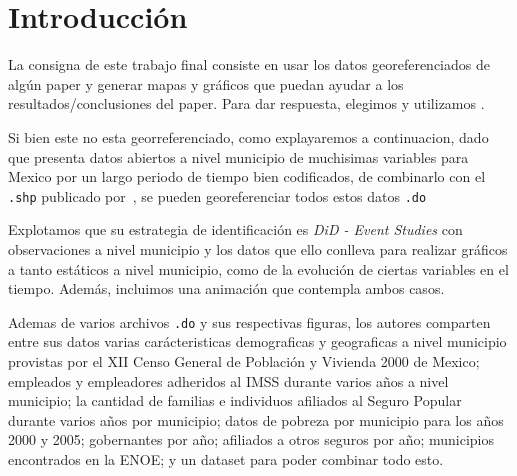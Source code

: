 \documentclass[9pt]{article}
\begin{document}
\section*{Introducci\'on}
La consigna de este trabajo final consiste en usar los datos georeferenciados de algún paper y generar mapas y gráficos que puedan ayudar a los resultados/conclusiones del paper. Para dar respuesta, elegimos y utilizamos \cite{10.1257/pol.6.4.71}. 

Si bien este no est\’a georreferenciado, como explayaremos a continuaci\’on, dado que presenta datos abiertos a nivel municipio de much\’isimas variables para M\’exico por un largo per\’iodo de tiempo bien codificados, de combinarlo con el \texttt{.shp} publicado por~\cite{shapefile}, se pueden georeferenciar todos estos datos \texttt{.do}

Explotamos que su estrategia de identificaci\'on es \textit{DiD - Event Studies} con observaciones a nivel municipio y los datos que ello conlleva para realizar gr\'aficos a tanto est\'aticos a nivel municipio, como de la evoluci\'on de ciertas variables en el tiempo. Adem\'as, incluimos una animaci\'on que contempla ambos casos.

Adem\’as de varios archivos \texttt{.do} y sus respectivas figuras, los autores comparten entre sus datos varias carácter\’isticas demogr\’aficas y geogr\’aficas a nivel municipio provistas por el XII Censo General de Población y Vivienda 2000 de M\’exico; empleados y empleadores adheridos al IMSS durante varios a\~nos a nivel municipio;  la cantidad de familias e individuos afiliados al Seguro Popular durante varios a\~nos por municipio; datos de pobreza por municipio para los a\~nos 2000 y 2005; gobernantes por a\~no; afiliados a otros seguros por a\~no; municipios encontrados en la ENOE; y un dataset para poder combinar todo esto.
\end{document}
